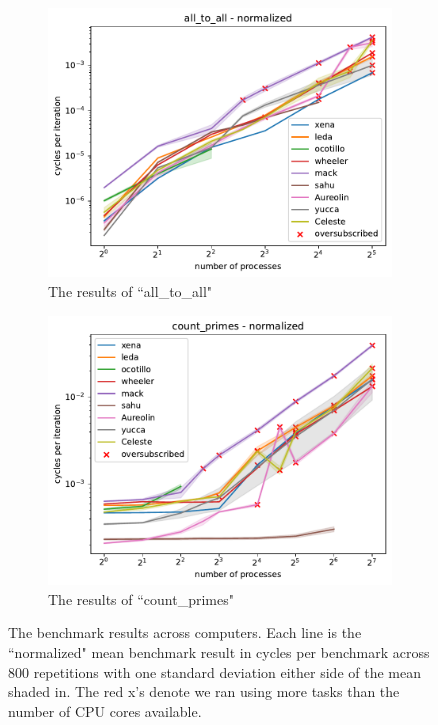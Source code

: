 \documentclass{article}
\begin{document}
\begin{figure}[h!]
    \centering
    \begin{subfigure}[b]{0.49\textwidth}
         \centering
         \includegraphics[width=\textwidth]{figures/final/all_to_all_normalized.pdf}
         \caption{The results of ``all\_to\_all"}
         \label{fig:all_to_all}
     \end{subfigure}
     \hfill
     \begin{subfigure}[b]{0.49\textwidth}
         \centering
         \includegraphics[width=\textwidth]{figures/final/count_primes_normalized.pdf}
         \caption{The results of ``count\_primes"}
         \label{fig:count_primes}
     \end{subfigure}
     \hfill
    \caption{The benchmark results across computers. Each line is the ``normalized" mean benchmark result in cycles per benchmark across 800 repetitions with one standard deviation either side of the mean shaded in. The red x's denote we ran using more tasks than the number of CPU cores available. }
    \label{fig:normalized}
\end{figure}
\end{document}
